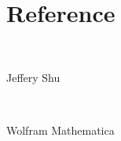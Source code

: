 \documentclass{article}
\begin{document}
\newpage

\section*{Reference}

~

Jeffery Shu

~

Wolfram Mathematica
\end{document}
